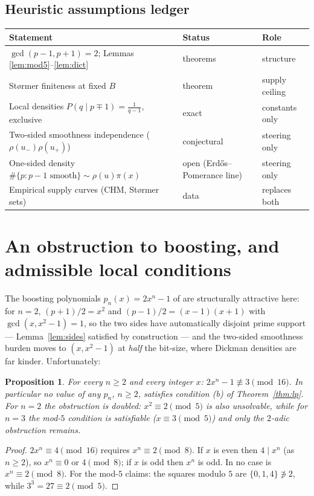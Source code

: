 \documentclass[11pt]{article}
\newtheorem{proposition}[theorem]{Proposition}
\theoremstyle{remark}
\begin{document}
\subsection{Heuristic assumptions ledger}

\begin{center}
\begin{tabular}{@{}lll@{}}
\toprule
Statement & Status & Role \\
\midrule
$\gcd(p-1,p+1)=2$; Lemmas \ref{lem:mod5}--\ref{lem:dict} & theorems & structure \\
St\o rmer finiteness at fixed $B$ & theorem & supply ceiling \\
Local densities $P(q \mid p\mp1) = \tfrac1{q-1}$, exclusive & exact & constants only \\
Two-sided smoothness independence ($\rho(u_-)\rho(u_+)$) & conjectural & steering only \\
One-sided density $\#\{p : p-1 \text{ smooth}\} \sim \rho(u)\pi(x)$ &
open (Erd\H{o}s--Pomerance line) & steering only \\
Empirical supply curves (CHM, St\o rmer sets) & data & replaces both \\
\bottomrule
\end{tabular}
\end{center}

\section{An obstruction to boosting, and admissible local conditions}
\label{sec:boost}

The boosting polynomials $p_n(x) = 2x^n - 1$ of \cite{BCCEMNS23,Sterner23} are
structurally attractive here: for $n = 2$, $(p+1)/2 = x^2$ and $(p-1)/2 =
(x-1)(x+1)$ with $\gcd(x, x^2-1) = 1$, so the two sides have automatically
disjoint prime support --- Lemma~\ref{lem:sides} satisfied by construction ---
and the two-sided smoothness burden moves to $(x, x^2-1)$ at \emph{half} the
bit-size, where Dickman densities are far kinder. Unfortunately:

\begin{proposition}\label{prop:boost}
For every $n \ge 2$ and every integer $x$: $2x^n - 1 \not\equiv 3 \pmod{16}$.
In particular no value of any $p_n$, $n \ge 2$, satisfies condition (b) of
Theorem~\ref{thm:lp}. For $n = 2$ the obstruction is doubled: $x^2 \equiv 2
\pmod 5$ is also unsolvable, while for $n = 3$ the mod-$5$ condition is
satisfiable ($x \equiv 3 \pmod 5$) and only the $2$-adic obstruction remains.
\end{proposition}
\begin{proof}
$2x^n \equiv 4 \pmod{16}$ requires $x^n \equiv 2 \pmod 8$. If $x$ is even then
$4 \mid x^n$ (as $n \ge 2$), so $x^n \equiv 0$ or $4 \pmod 8$; if $x$ is odd
then $x^n$ is odd. In no case is $x^n \equiv 2 \pmod 8$. For the mod-$5$
claims: the squares modulo $5$ are $\{0,1,4\} \not\ni 2$, while $3^3 = 27
\equiv 2 \pmod 5$.
\end{proof}
\end{document}
